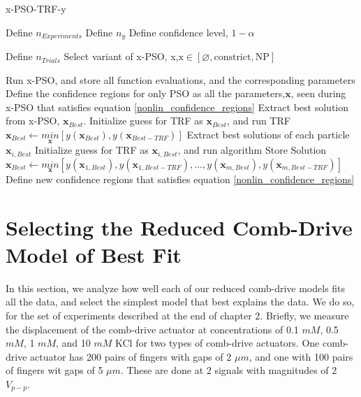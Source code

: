 \begin{breakablealgorithm}
\caption{x-PSO-TRF-y}
\label{xPSOTRFy_algorithm} 
\begin{algorithmic}[1]
\State Define $n_{Experiments}$ 
\State Define $n_y$  
\State Define confidence level, $1-\alpha$
\EndProcedure

\State Define $n_{Trials}$ 
\State Select variant of x-PSO, x,$\textrm{x} \in [\varnothing,\textrm{constrict},\textrm{NP}]$ 
\EndProcedure

\State Run x-PSO, and store all function evaluations, and the corresponding parameters
\State Define the confidence regions for only PSO as all the parameters,$\mathbf{x}$, seen during x-PSO that satisfies equation \ref{nonlin_confidence_regions}
\State Extract best solution from x-PSO, $\mathbf{x}_{Best}$.
\State Initialize guess for TRF as $\mathbf{x}_{Best}$, and run TRF
\State $\mathbf{x}_{Best} \leftarrow \underset{\mathbf{x}}{min}[y(\mathbf{x}_{Best}),y(\mathbf{x}_{Best-TRF})]$
\EndIf
{}
\State Extract best solutions of each particle $\mathbf{x}_{i,Best}$ 
\State Initialize guess for TRF as $\mathbf{x}_{i,Best}$, and run algorithm
\State Store Solution
\EndFor
\State $\mathbf{x}_{Best} \leftarrow \underset{\mathbf{x}}{min}[y(\mathbf{x}_{1,Best}),y(\mathbf{x}_{1,Best-TRF}),...,y(\mathbf{x}_{m,Best}),y(\mathbf{x}_{m,Best-TRF})]$
\EndIf
\State Define new confidence regions that satisfies equation \ref{nonlin_confidence_regions}
\EndFor
\end{algorithmic}
\end{breakablealgorithm}

\section{Selecting the Reduced Comb-Drive Model of Best Fit}
In this section, we analyze how well each of our reduced comb-drive models fits all the data, and select the simplest model that best explains the data. We do so, for the set of experiments described at the end of chapter 2. Briefly, we measure the displacement of the comb-drive actuator at concentrations of 0.1 $mM$, 0.5 $mM$, 1 $mM$, and 10 $mM$ KCl for two types of comb-drive actuators. One comb-drive actuator has 200 pairs of fingers with gaps of 2 $\mu m$, and one with 100 pairs of fingers wit gaps of 5 $\mu m$. These are done at 2 signals with magnitudes of 2 $V_{p-p}$.




